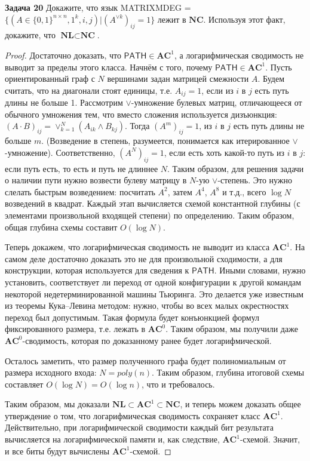 \textbf{Задача 20} Докажите, что язык \textsf{MATRIXMDEG} = $\{(A \in \{0, 1\}^{n \times n}, 1^k, i, j) | (A^{\lor k})_{ij} = 1 \}$ лежит в $\textbf{NC}$. Используя этот факт, докажите, что $\textbf{NL} \subset \textbf{NC}$.

\begin{proof} Достаточно доказать, что $\mathsf{PATH} \in \textbf{AC}^1 $, а логарифмическая сводимость не выводит за пределы этого класса. Начнём с того, почему $\mathsf{PATH} \in \textbf{AC}^1$. Пусть ориентированный граф с $N$ вершинами задан матрицей смежности $A$. Будем считать, что на диагонали стоят единицы, т.е. $A_{ij} = 1$, если из $i$ в $j$ есть путь длины не больше 1. Рассмотрим $\lor$-умножение булевых матриц, отличающееся от обычного умножения тем, что вместо сложения используется дизъюнкция: $(A \cdot B)_{ij} = \lor_{k=1}^{N}(A_{ik} \land B_{kj})$.
Тогда $(A^m)_{ij} = 1$, из $i$ в $j$ есть путь длины не больше $m$. (Возведение в степень, разумеется, понимается как итерированное $\lor$-умножение). Соответственно, $(A^N)_{ij} = 1$, если есть хоть какой-то путь из $i$ в $j$: если путь есть, то есть и путь не длиннее $N$. Таким образом, для решения задачи о наличии пути нужно возвести булеву матрицу в $N$-ую $\lor$-степень. Это нужно слелать быстрым возведением: посчитать $A^2$, затем $A^4$, $A^8$ и т.д., всего $\log N$ возведений в
квадрат. Каждый этап вычисляется схемой константной глубины (с элементами произвольной входящей степени) по определению. Таким образом, общая глубина схемы составит $O(\log N)$.

Теперь докажем, что логарифмическая сводимость не выводит из класса $\textbf{AC}^1$. На самом деле достаточно доказать это не для произвольной сходимости, а для конструкции, которая используется для сведения к $\mathsf{PATH}$. Иными словами, нужно установить, соответствует ли переход от одной конфигурации
к другой командам некоторой недетерминированной машины Тьюринга. Это делается уже известным из теоремы Кука–Левина методом: нужно, чтобы во всех малых окрестностях переход был допустимым. Такая формула будет конъюнкцией формул фиксированного размера, т.е. лежать в $\textbf{AC}^0$. Таким образом,
мы получили даже $\textbf{AC}^0$-сводимость, которая по доказанному ранее будет логарифмической.

Осталось заметить, что размер полученного графа будет полиномиальным
от размера исходного входа: $N = poly(n)$. Таким образом, глубина итоговой схемы составляет $O(\log N) = O(\log n)$, что и требовалось.

Таким образом, мы доказали $\textbf{NL} \subset \textbf{AC}^1 \subset \textbf{NC}$, и теперь можем доказать общее утверждение о том, что логарифмическая сводимость сохраняет класс $\textbf{AC}^1$. Действительно, при логарифмической сводимости каждый бит результата вычисляется на логарифмической памяти и, как следствие, $\textbf{AC}^1$-схемой. Значит,
и все биты будут вычислены $\textbf{AC}^1$-схемой.

\end{proof}